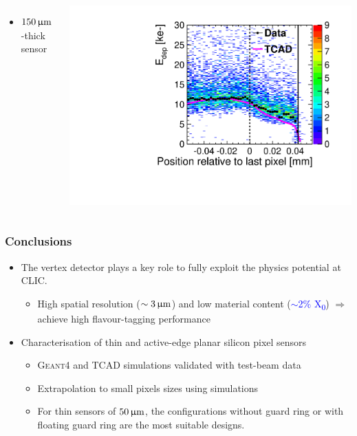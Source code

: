 \begin{frame}
\begin{columns}
    \begin{itemize}
    \item $150\,\upmu\mathrm{m}$-thick sensor
    \end{itemize}
    \centering
    \includegraphics[width=\textwidth]{../figures/ActiveEdge/55_GNDGR_150_Edep_TCAD_data.pdf}
  \end{columns}

\end{frame}

\label{lastslide}
\begin{frame}
  \frametitle{Conclusions}

  \begin{itemize}
  \item The vertex detector plays a key role to fully exploit the
    physics potential at CLIC.
    \begin{itemize}
    \item High spatial resolution (\textcolor{Blue}{$\sim3\,\upmu\mathrm{m}$})
      and low material content (\textcolor{Blue}{$\sim$2\%
        X\textsubscript{0}}) $\Rightarrow$ achieve high
      flavour-tagging performance
    \end{itemize} 
    \item Characterisation of thin and active-edge planar silicon
      pixel sensors
      \begin{itemize}
      \item \textsc{Geant4} and TCAD simulations validated with
        test-beam data
      \item Extrapolation to small pixels sizes using simulations
      \item For thin sensors of $50\,\upmu\mathrm{m}$, the configurations
        without guard ring or with floating guard ring are the most
        suitable designs.
      \end{itemize}

  \end{itemize}

\end{frame}